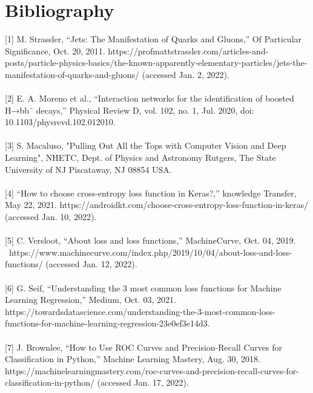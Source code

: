 \documentclass[11pt, a4page]{article}
\begin{document}
\section{Bibliography}
\begin{thebibliography}{}



[1] M. Strassler, “Jets: The Manifestation of Quarks and Gluons,” Of Particular Significance, Oct. 20, 2011. https://profmattstrassler.com/articles-and-posts/particle-physics-basics/the-known-apparently-elementary-particles/jets-the-manifestation-of-quarks-and-gluons/ (accessed Jan. 2, 2022).\\
\\

[2] E. A. Moreno et al., “Interaction networks for the identification of boosted H→bb¯ decays,” Physical Review D, vol. 102, no. 1, Jul. 2020, doi: 10.1103/physrevd.102.012010.\\
\\

[3] S. Macaluso, "Pulling Out All the Tops with Computer Vision and Deep Learning", NHETC, Dept. of Physics and Astronomy
Rutgers, The State University of NJ Piscataway, NJ 08854 USA.\\
\\

[4] “How to choose cross-entropy loss function in Keras?,” knowledge Transfer, May 22, 2021. https://androidkt.com/choose-cross-entropy-loss-function-in-keras/ (accessed Jan. 10, 2022).\\
\\

[5] C. Versloot, “About loss and loss functions,” MachineCurve, Oct. 04, 2019. \ https://www.machinecurve.com/index.php/2019/10/04/about-loss-and-loss-functions/ (accessed Jan. 12, 2022).\\
\\

[6] G. Seif, “Understanding the 3 most common loss functions for Machine Learning Regression,” Medium, Oct. 03, 2021. https://towardsdatascience.com/understanding-the-3-most-common-loss-functions-for-machine-learning-regression-23e0ef3e14d3.\\
\\


[7] J. Brownlee, “How to Use ROC Curves and Precision-Recall Curves for Classification in Python,” Machine Learning Mastery, Aug. 30, 2018. https://machinelearningmastery.com/roc-curves-and-precision-recall-curves-for-classification-in-python/ (accessed Jan. 17, 2022). 
\end{thebibliography}


\vspace{5mm}
\justifying
\end{document}
